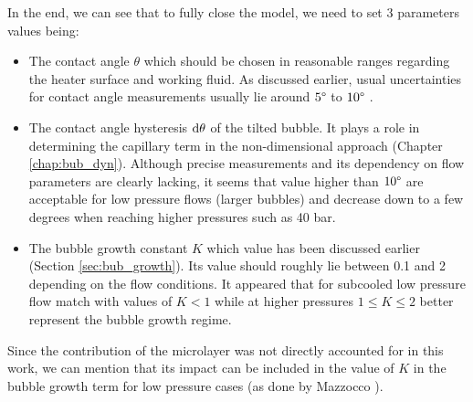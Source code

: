 \npar


In the end, we can see that to fully close the model, we need to set 3 parameters values being:

\begin{itemize}
\item The contact angle $\theta$ which should be chosen in reasonable ranges regarding the heater surface and working fluid. As discussed earlier, usual uncertainties for contact angle measurements usually lie around $5\degree$ to $10\degree$ \cite{guan_bubble_2015}.

\item The contact angle hysteresis $\mathrm{d}\theta$ of the tilted bubble. It plays a role in determining the capillary term in the non-dimensional approach (Chapter \ref{chap:bub_dyn}). Although precise measurements and its dependency on flow parameters are clearly lacking, it seems that value higher than $10 \degree$ are acceptable for low pressure flows (larger bubbles) and decrease down to a few degrees when reaching higher pressures such as 40 bar.

\item The bubble growth constant $K$ which value has been discussed earlier (Section \ref{sec:bub_growth}). Its value should roughly lie between 0.1 and 2 depending on the flow conditions. It appeared that for subcooled low pressure flow match with values of $K < 1$ while at higher pressures $1 \leq K \leq 2$ better represent the bubble growth regime.
\end{itemize}

\begin{remark*}{}
Since the contribution of the microlayer was not directly accounted for in this work, we can mention that its impact can be included in the value of $K$ in the bubble growth term for low pressure cases (as done by Mazzocco \etal \cite{mazzocco_reassessed_2018}).
\end{remark*}




